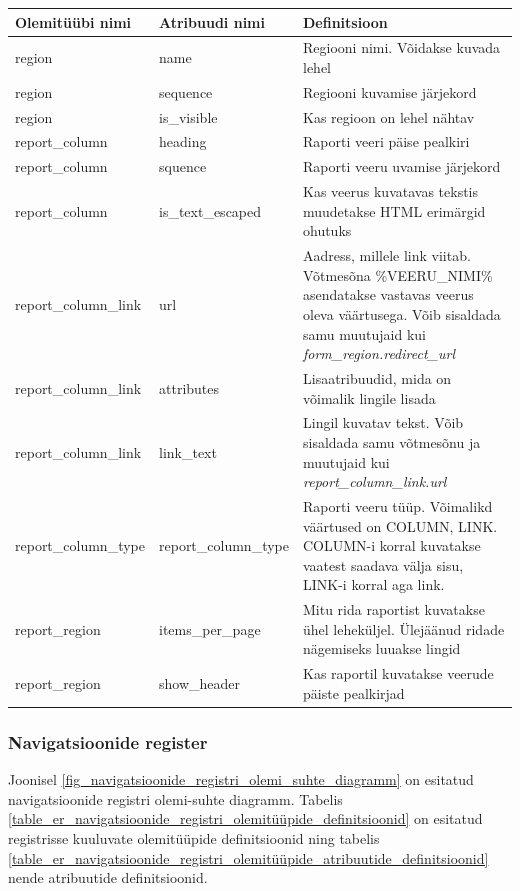 \documentclass[a4paper,12pt]{article} %
\begin{document}
\begin{table}[H]
\centering
\begin{tabular}{|p{3cm}|p{3cm}|p{9cm}|}
\hline
\rowcolor{rowgray}
Olemitüübi nimi & Atribuudi nimi & Definitsioon \\ \hline

region & name & Regiooni nimi. Võidakse kuvada lehel \\ \hline
region & sequence & Regiooni kuvamise järjekord \\ \hline
region & is\_visible & Kas regioon on lehel nähtav \\ \hline
report\_column & heading & Raporti veeri päise pealkiri \\ \hline
report\_column & squence & Raporti veeru uvamise järjekord \\ \hline
report\_column & is\_text\_escaped & Kas veerus kuvatavas tekstis muudetakse HTML erimärgid ohutuks \\ \hline
report\_column\newline\_link & url & Aadress, millele link viitab. Võtmesõna \%VEERU\_NIMI\% asendatakse vastavas veerus oleva väärtusega. Võib sisaldada samu muutujaid kui \textit{form\_region.redirect\_url} \\ \hline
report\_column\newline\_link & attributes & Lisaatribuudid, mida on võimalik lingile lisada \\ \hline
report\_column\newline\_link & link\_text & Lingil kuvatav tekst. Võib sisaldada samu võtmesõnu ja muutujaid kui \textit{report\_column\_link.url}\\ \hline
report\_column\newline\_type & report\_column\newline\_type & Raporti veeru tüüp. Võimalikd väärtused on COLUMN, LINK. COLUMN-i korral kuvatakse vaatest saadava välja sisu, LINK-i korral aga link. \\ \hline
report\_region & items\_per\_page & Mitu rida raportist kuvatakse ühel leheküljel. Ülejäänud ridade nägemiseks luuakse lingid \\ \hline
report\_region & show\_header & Kas raportil kuvatakse veerude päiste pealkirjad \\ \hline
\end{tabular}
\end{table}

\subsubsection{Navigatsioonide register}
Joonisel \ref{fig_navigatsioonide_registri_olemi_suhte_diagramm} on esitatud navigatsioonide registri olemi-suhte diagramm. Tabelis \ref{table_er_navigatsioonide_registri_olemitüüpide_definitsioonid} on esitatud registrisse kuuluvate olemitüüpide definitsioonid ning tabelis \ref{table_er_navigatsioonide_registri_olemitüüpide_atribuutide_definitsioonid} nende atribuutide definitsioonid.
\end{document}
